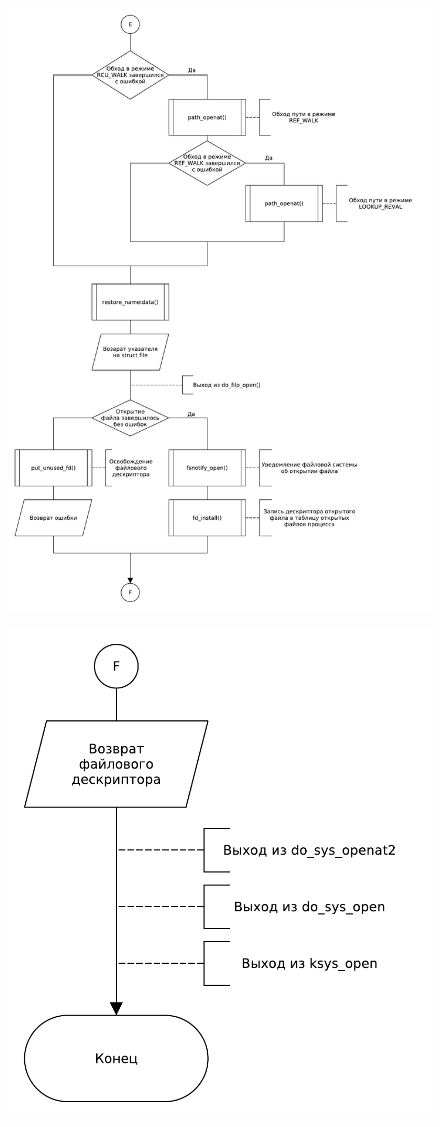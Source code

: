 \begin{figure}[H]
    \centering
    \caption{}
    \includegraphics[scale=0.5]{pdf/flowchart06.pdf}
\end{figure}
\begin{figure}[H]
    \centering
    \caption{}
    \includegraphics[scale=0.5]{pdf/flowchart07.pdf}
\end{figure}

